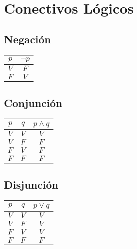 



\section{Conectivos Lógicos}
  \subsection{Negaci\'on}
  \begin{tabular}{cc}
    $p$ & $\neg p$ \\ \hline
    $V$ & $F$ \\
    $F$ &$V$ \\
  \end{tabular}
\subsection{Conjunci\'on}
  \begin{tabular}{ccc}
    $p$  & $q$ & $p \wedge q$ \\ \hline
    $V$ & $V$ & $V$ \\
    $V$ & $F$ &$F$ \\
    $F$ & $V$ & $F$ \\
    $F$ & $F$ & $F$\\
  \end{tabular}
\subsection{Disjunci\'on}
  \begin{tabular}{ccc}
    $p$  & $q$ & $p \vee q$ \\ \hline
    $V$ & $V$ & $V$ \\
    $V$ & $F$ &$V$ \\
    $F$ & $V$ & $V$ \\
    $F$ & $F$ & $F$\\
  \end{tabular}

